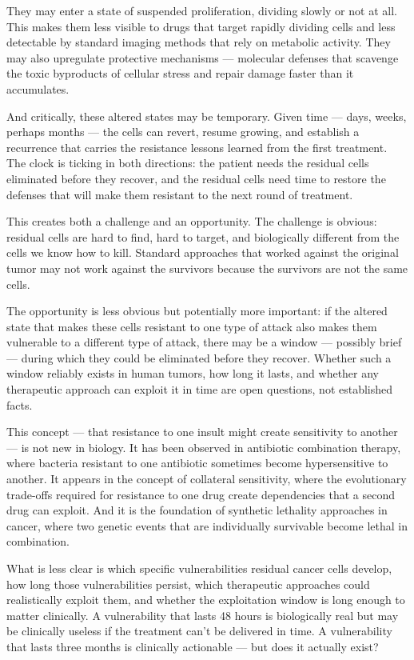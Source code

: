 \documentclass[11pt,twoside,openright]{report}
\begin{document}
They may enter a state of suspended proliferation, dividing slowly or not at all. This makes them less visible to drugs that target rapidly dividing cells and less detectable by standard imaging methods that rely on metabolic activity. They may also upregulate protective mechanisms --- molecular defenses that scavenge the toxic byproducts of cellular stress and repair damage faster than it accumulates.

And critically, these altered states may be temporary. Given time --- days, weeks, perhaps months --- the cells can revert, resume growing, and establish a recurrence that carries the resistance lessons learned from the first treatment. The clock is ticking in both directions: the patient needs the residual cells eliminated before they recover, and the residual cells need time to restore the defenses that will make them resistant to the next round of treatment.

This creates both a challenge and an opportunity. The challenge is obvious: residual cells are hard to find, hard to target, and biologically different from the cells we know how to kill. Standard approaches that worked against the original tumor may not work against the survivors because the survivors are not the same cells.

The opportunity is less obvious but potentially more important: if the altered state that makes these cells resistant to one type of attack also makes them vulnerable to a different type of attack, there may be a window --- possibly brief --- during which they could be eliminated before they recover. Whether such a window reliably exists in human tumors, how long it lasts, and whether any therapeutic approach can exploit it in time are open questions, not established facts.

This concept --- that resistance to one insult might create sensitivity to another --- is not new in biology. It has been observed in antibiotic combination therapy, where bacteria resistant to one antibiotic sometimes become hypersensitive to another. It appears in the concept of collateral sensitivity, where the evolutionary trade-offs required for resistance to one drug create dependencies that a second drug can exploit. And it is the foundation of synthetic lethality approaches in cancer, where two genetic events that are individually survivable become lethal in combination.

What is less clear is which specific vulnerabilities residual cancer cells develop, how long those vulnerabilities persist, which therapeutic approaches could realistically exploit them, and whether the exploitation window is long enough to matter clinically. A vulnerability that lasts 48 hours is biologically real but may be clinically useless if the treatment can't be delivered in time. A vulnerability that lasts three months is clinically actionable --- but does it actually exist?
\end{document}
